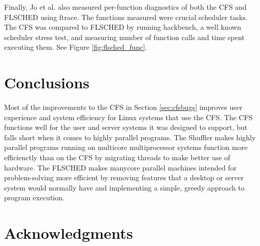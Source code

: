 \documentclass{sig-alternate}
\begin{document}
Finally, Jo et al. also measured per-function diagnostics of both the CFS and FLSCHED using ftrace. The functions measured were crucial scheduler tasks. The CFS was compared to FLSCHED by running hackbench, a well known scheduler stress test, and measuring number of function calls and time spent executing them. See Figure \ref{fig:flsched_func}.\cite{Jo:2017}

\begin{figure*}
\centering
{}
\caption{Average time and function call counts for critical scheduler tasks. The numbers were gathered using ftrace while running the hackbench stress test for thread schedulers. From Jo et al.~\cite{Jo:2017}}
\label{fig:flsched_func}
\end{figure*}


\section{Conclusions}
\label{sec:conclusions}

Most of the improvements to the CFS in Section \ref{sec:cfsbugs} improves user experience and system efficiency for Linux systems that use the CFS. The CFS functions well for the user and server systems it was designed to support, but falls short when it comes to highly parallel programs. The Shuffler makes highly parallel programs running on multicore multiprocessor systems function more efficienctly than on the CFS by migrating threads to make better use of hardware. The FLSCHED makes manycore parallel machines intended for problem-solving more efficient by removing features that a desktop or server system would normally have and implementing a simple, greedy approach to program execution.

\section*{Acknowledgments}
\label{sec:acknowledgments}


  
\end{document}

